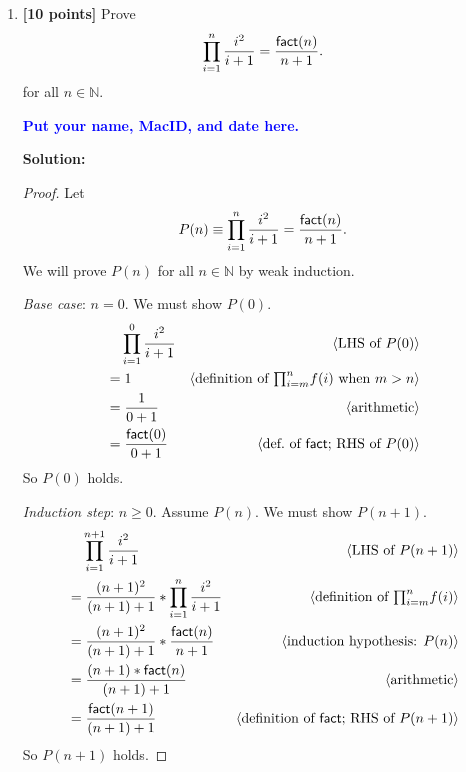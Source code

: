 \documentclass[11pt,fleqn]{article}
\newcommand{\mname}[1]{\mbox{\sf #1}}
\newcommand{\pnote}[1]{{\langle \text{#1} \rangle}}
\begin{document}
\begin{enumerate}

  \item \textbf{[10 points]} Prove \[\prod_{i = 1}^{n} \frac{i^2}{i +
    1} = \frac{\mname{fact}(n)}{n + 1}.\] for all $n \in \mathbb{N}$.

  \bigskip

  \textcolor{blue}{\textbf{Put your name, MacID, and date here.}}

  \bigskip

  \textbf{Solution:}

\begin{proof}
Let \[P(n) \equiv \prod_{i = 1}^{n} \frac{i^2}{i + 1}=
\frac{\mname{fact}(n)}{n + 1}.\] We will prove $P(n)$ for all $n \in
\mathbb{N}$ by weak induction.

\medskip

\emph{Base case}: $n = 0$.  We must show $P(0)$.
\begin{align*}
  &\phantom{{}=} \prod_{i = 1}^{0} \frac{i^2}{i + 1} & \pnote{LHS of $P(0)$}\\
  &= 1                              & \pnote{definition of $\textstyle{\prod}_{i=m}^{n} f(i)$ when $m > n$}\\
  &= \frac{1}{0 + 1}                & \pnote{arithmetic}\\
  &= \frac{\mname{fact}(0)}{0 + 1}  & \pnote{def.\ of \mname{fact}; RHS of $P(0)$}
\end{align*}
So $P(0)$ holds.

\medskip

\emph{Induction step}: $n \ge 0$. Assume $P(n)$. We must show $P(n + 1)$.
\begin{align*}
  &\phantom{{}=} \prod_{i = 1}^{n+1} \frac{i^2}{i + 1}   
    & \pnote{LHS of $P(n + 1)$}\\
  &= \frac{(n+1)^2}{(n+1) + 1} * \prod_{i = 1}^{n} \frac{i^2}{i + 1}       
    & \pnote{definition of $\textstyle{\prod}_{i=m}^{n} f(i)$}\\
  &= \frac{(n+1)^2}{(n+1) + 1} * \frac{\mname{fact}(n)}{n + 1} 
    & \pnote{induction hypothesis: $P(n)$}\\
  &= \frac{(n+1)*\mname{fact}(n)}{(n+1) + 1}            
    & \pnote{arithmetic}\\
  &= \frac{\mname{fact}(n+1)}{(n+1) + 1}                 
    & \pnote{definition of \mname{fact}; RHS of $P(n + 1)$}
\end{align*}
So $P(n + 1)$ holds.

\medskip


\end{proof}
\end{enumerate}
\end{document}
